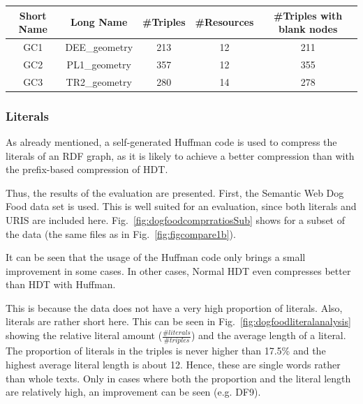 \begin{center}
	\begin{tabular}{|c|c|c|c|c|}
		\hline 
		Short Name & Long Name & \#Triples & \#Resources & \#Triples with blank nodes \\ 
		\hline
		GC1 & DEE\_geometry & 213 & 12 & 211 \\
		\hline
		GC2 & PL1\_geometry & 357 & 12 & 355 \\
		\hline
		GC3 & TR2\_geometry & 280 & 14 & 278 \\
		\hline
	\end{tabular} 
	\label{tab:BlankImproveDatasets}
\end{center}


\clearpage
\subsubsection{Literals}\label{sec:evaluationLiterals}

As already mentioned, a self-generated Huffman code is used to compress the literals of an RDF graph, as it is likely to achieve a better compression than with the prefix-based compression of HDT.

Thus, the results of the evaluation are presented. First, the Semantic Web Dog Food data set is used. This is well suited for an evaluation, since both literals and URIS are included here. Fig.~\ref{fig:dogfoodcomprratiosSub} shows  for a subset of the data (the same files as in Fig.~\ref{fig:figcompare1b}).

It can be seen that the usage of the Huffman code only brings a small improvement in some cases. In other cases, Normal HDT even compresses better than HDT with Huffman.

This is because the data does not have a very high proportion of literals. Also, literals are rather short here. This can be seen in Fig.~\ref{fig:dogfoodliteralanalysis} showing the relative literal amount ($\frac{\#literals}{\#triples}$) and the average length of a literal. The proportion of literals in the triples is never higher than 17.5\% and the highest average literal length is about 12. Hence, these are single words rather than whole texts. Only in cases where both the proportion and the literal length are relatively high, an improvement can be seen (e.g. DF9).


